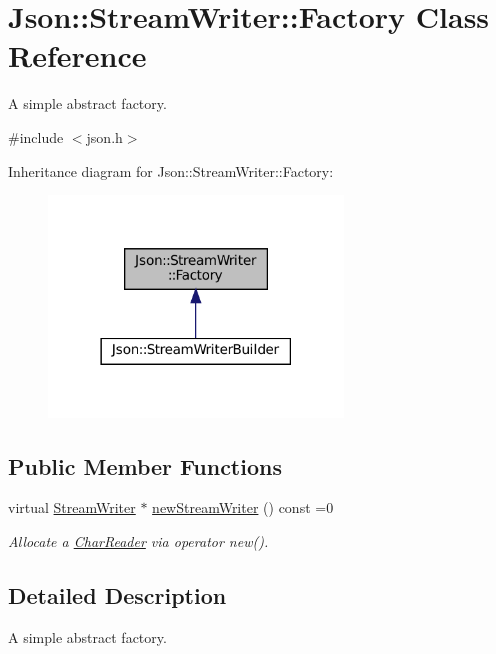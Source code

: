 \hypertarget{classJson_1_1StreamWriter_1_1Factory}{}\section{Json\+:\+:Stream\+Writer\+:\+:Factory Class Reference}
\label{classJson_1_1StreamWriter_1_1Factory}


A simple abstract factory.  




{\ttfamily \#include $<$json.\+h$>$}



Inheritance diagram for Json\+:\+:Stream\+Writer\+:\+:Factory\+:
\nopagebreak
\begin{figure}[H]
\begin{center}
\leavevmode
\includegraphics[width=222pt]{classJson_1_1StreamWriter_1_1Factory__inherit__graph}
\end{center}
\end{figure}
\subsection*{Public Member Functions}
\begin{DoxyCompactItemize}
\item 
virtual \hyperlink{classJson_1_1StreamWriter}{Stream\+Writer} $\ast$ \hyperlink{classJson_1_1StreamWriter_1_1Factory_a9d30ec53e8288cd53befccf1009c5f31}{new\+Stream\+Writer} () const =0
\begin{DoxyCompactList}\small\item\em Allocate a \hyperlink{classJson_1_1CharReader}{Char\+Reader} via operator new(). \end{DoxyCompactList}\end{DoxyCompactItemize}


\subsection{Detailed Description}
A simple abstract factory. 

